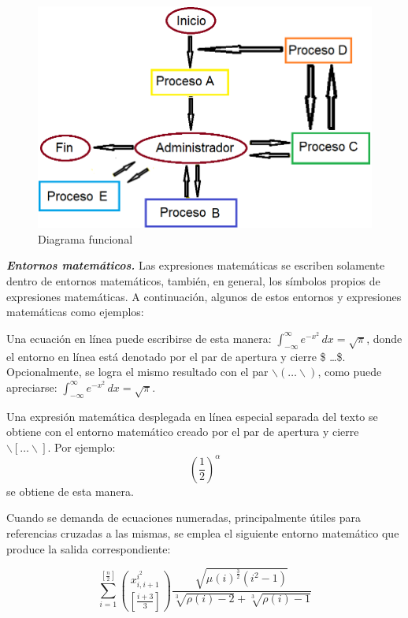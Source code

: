 \documentclass[12pt,a4paper]{article}
\begin{document}
\begin{figure}[H]
\begin{minipage}{\textwidth}
\begin{center}
\includegraphics[scale=.5]{./diag_funcional}
\caption{Diagrama funcional}
\label{fig:diagrama}
\end{center}
\end{minipage}
\end{figure}

\textbf{\textit{Entornos matemáticos.}} Las expresiones matemáticas se escriben solamente dentro de entornos matemáticos, también, en general, los símbolos propios de expresiones matemáticas. A continuación, algunos de estos entornos y expresiones matemáticas como ejemplos:

Una ecuación en línea puede escribirse de esta manera: $\int_{-\infty}^{\infty} e^{-x^{2}} \, dx
= \sqrt{\pi}$, donde el entorno en línea está denotado por el par de apertura y cierre \$ \dots \$. Opcionalmente, se logra el mismo resultado con el par $ \backslash( \dots \backslash) $, como puede apreciarse: \( \int_{-\infty}^{\infty} e^{-x^{2}} \, dx
= \sqrt{\pi} \).

Una expresión matemática desplegada en línea especial separada del texto se obtiene con el entorno matemático creado por el par de apertura y cierre $ \backslash[ \dots \backslash] $. Por ejemplo: \[ \left( \frac{1}{2} \right)^{\alpha} \] se obtiene de esta manera.

Cuando se demanda de ecuaciones numeradas, principalmente útiles para referencias cruzadas a las mismas, se emplea el siguiente entorno matemático que produce la salida correspondiente:

\begin{equation}
\sum_{i = 1}^{ \left[ \frac{n}{2} \right] }
\binom{ x_{i, i + 1}^{i^{2}} }
{ \left[ \frac{i + 3}{3} \right] }
\frac{ \sqrt{ \mu(i)^{ \frac{3}{2}} (i^{2} - 1) } }
{\sqrt[3]{\rho(i)-2} + \sqrt[3]{\rho(i) - 1}}
\end{equation}
\end{document}
